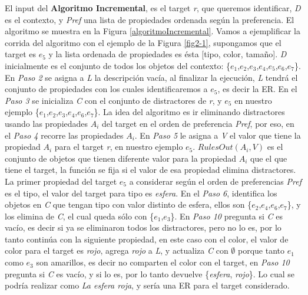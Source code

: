 
El input del {\bf Algoritmo Incremental}, es el target \emph{r}, que queremos identificar, \emph{D} es el contexto, y \emph{Pref} una lista de propiedades ordenada seg\'un la preferencia. El algoritmo se muestra en la Figura \ref{algoritmoIncremental}.
Vamos a ejemplificar la corrida del algoritmo con el ejemplo de la Figura \ref{fig2-1}, supongamos que el target es $e_{5}$ y la lista 
ordenada de propiedades es \'esta [tipo, color, tama\~no]. \emph{D} inicialmente es el conjunto de todos los objetos del contexto: 
\{$e_{1}$,$e_{2}$,$e_{3}$,$e_{4}$,$e_{5}$,$e_{6}$,$e_{7}$\}.
En {\it Paso 2} se asigna a \emph{L} la descripci\'on vac\'{i}a, al finalizar la ejecuci\'on, \emph{L} tendr\'a el conjunto de propiedades 
con los cuales identificaremos a $e_5$, es decir la ER. En el {\it Paso 3} se inicializa \emph{C} con el conjunto de distractores de \emph{r}, y $e_5$ en nuestro ejemplo \{$e_{1}$,$e_{2}$,$e_{3}$,$e_{4}$,$e_{6}$,$e_{7}$\}. 
La idea del algoritmo es ir eliminando distractores usando las propiedades $A_{i}$ del target en el orden de preferencia \emph{Pref}, por eso, en el {\it Paso 4} recorre las propiedades $A_{i}$. En {\it Paso 5} 
le asigna a \emph{V} el valor que tiene la propiedad $A_{i}$ para el target \emph{r}, en nuestro ejemplo $e_5$. $RulesOut(A_{i},V)$ es el 
conjunto de objetos que tienen 
diferente valor para la propiedad $A_{i}$ que el que tiene el target, la funci\'on se fija si el valor de esa propiedad elimina distractores. 
La primer propiedad del target $e_5$ a considerar seg\'un el orden de preferencias \emph{Pref} es el tipo, el valor del target para tipo 
es {\it esfera}. En el {\it Paso 6}, identifica los objetos en \emph{C} que tengan tipo con valor distinto de esfera, ellos son \{$e_{2}$,$e_{4}$,$e_{6}$,$e_{7}$\}, y los elimina de \emph{C}, el cual queda s\'olo con \{$e_{1}$,$e_{3}$\}. En {\it Paso 10} pregunta si \emph{C} 
es vac\'io, es decir si ya se eliminaron todos los distractores, pero no lo es, por lo tanto contin\'ua con la siguiente propiedad, 
en este caso con el color, el valor de color para el target es {\it rojo}, agrega {\it rojo} a \emph{L}, y actualiza \emph{C} con 
$\emptyset$ porque tanto $e_{1}$ como $e_{3}$ son amarillos, es decir no comparten el color con el target, en {\it Paso 10} pregunta si \emph{C} es vac\'io, y si lo es, 
por lo tanto devuelve \{{\it esfera}, {\it rojo}\}. Lo cual se podr\'ia realizar como {\it La esfera roja}, y ser\'ia una ER para el target considerado.


